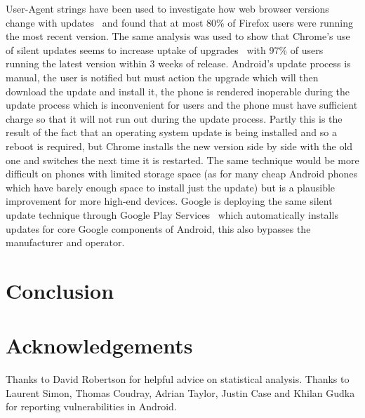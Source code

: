 \documentclass[conference,a4paper,twoside]{IEEEtran}
\begin{document}
User-Agent strings have been used to investigate how web browser versions change with updates~\cite{Frei2008} and found that at most 80\% of Firefox users were running the most recent version.
The same analysis was used to show that Chrome's use of silent updates seems to increase uptake of upgrades~\cite{Duebendorfer2010} with 97\% of users running the latest version within 3 weeks of release.
Android's update process is manual, the user is notified but must action the upgrade which will then download the update and install it, the phone is rendered inoperable during the update process which is inconvenient for users and the phone must have sufficient charge so that it will not run out during the update process.
Partly this is the result of the fact that an operating system update is being installed and so a reboot is required, but Chrome installs the new version side by side with the old one and switches the next time it is restarted.
The same technique would be more difficult on phones with limited storage space (as for many cheap Android phones which have barely enough space to install just the update) but is a plausible improvement for more high-end devices.
Google is deploying the same silent update technique through Google Play Services~\cite{TODO} which automatically installs updates for core Google components of Android, this also bypasses the manufacturer and operator.



\section{Conclusion}
\label{sec:conclusion}

\section*{Acknowledgements}
Thanks to David Robertson for helpful advice on statistical analysis.
Thanks to Laurent Simon, Thomas Coudray, Adrian Taylor, Justin Case and Khilan Gudka for reporting vulnerabilities in Android.

\printbibliography
\end{document}

